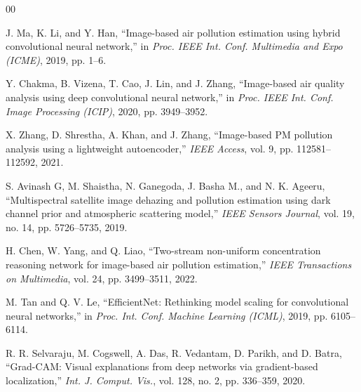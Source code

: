 \documentclass[conference]{IEEEtran}
\begin{document}
\begin{thebibliography}{00}

J. Ma, K. Li, and Y. Han, ``Image-based air pollution estimation using
hybrid convolutional neural network,'' in \textit{Proc. IEEE Int. Conf.
Multimedia and Expo (ICME)}, 2019, pp. 1--6.

Y. Chakma, B. Vizena, T. Cao, J. Lin, and J. Zhang, ``Image-based air
quality analysis using deep convolutional neural network,'' in
\textit{Proc. IEEE Int. Conf. Image Processing (ICIP)}, 2020, pp. 3949--3952.

X. Zhang, D. Shrestha, A. Khan, and J. Zhang, ``Image-based PM pollution
analysis using a lightweight autoencoder,'' \textit{IEEE Access}, vol. 9,
pp. 112581--112592, 2021.

S. Avinash G, M. Shaistha, N. Ganegoda, J. Basha M., and N. K. Ageeru,
``Multispectral satellite image dehazing and pollution estimation using
dark channel prior and atmospheric scattering model,'' \textit{IEEE Sensors
Journal}, vol. 19, no. 14, pp. 5726--5735, 2019.

H. Chen, W. Yang, and Q. Liao, ``Two-stream non-uniform concentration
reasoning network for image-based air pollution estimation,''
\textit{IEEE Transactions on Multimedia}, vol. 24, pp. 3499--3511, 2022.

M. Tan and Q. V. Le, ``EfficientNet: Rethinking model scaling for
convolutional neural networks,'' in \textit{Proc. Int. Conf. Machine
Learning (ICML)}, 2019, pp. 6105--6114.

R. R. Selvaraju, M. Cogswell, A. Das, R. Vedantam, D. Parikh, and
D. Batra, ``Grad-CAM: Visual explanations from deep networks via
gradient-based localization,'' \textit{Int. J. Comput. Vis.}, vol. 128,
no. 2, pp. 336--359, 2020.

\end{thebibliography}
\end{document}
